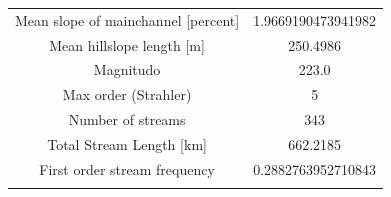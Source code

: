 \documentclass[11pt,]{article}
\begin{document}
\begin{longtable}[]{@{}cc@{}}
\begin{minipage}[t]{0.65\columnwidth}\centering\strut
Mean slope of mainchannel {[}percent{]}\strut
\end{minipage} & \begin{minipage}[t]{0.29\columnwidth}\centering\strut
1.9669190473941982\strut
\end{minipage}\tabularnewline
\begin{minipage}[t]{0.65\columnwidth}\centering\strut
Mean hillslope length {[}m{]}\strut
\end{minipage} & \begin{minipage}[t]{0.29\columnwidth}\centering\strut
250.4986\strut
\end{minipage}\tabularnewline
\begin{minipage}[t]{0.65\columnwidth}\centering\strut
Magnitudo\strut
\end{minipage} & \begin{minipage}[t]{0.29\columnwidth}\centering\strut
223.0\strut
\end{minipage}\tabularnewline
\begin{minipage}[t]{0.65\columnwidth}\centering\strut
Max order (Strahler)\strut
\end{minipage} & \begin{minipage}[t]{0.29\columnwidth}\centering\strut
5\strut
\end{minipage}\tabularnewline
\begin{minipage}[t]{0.65\columnwidth}\centering\strut
Number of streams\strut
\end{minipage} & \begin{minipage}[t]{0.29\columnwidth}\centering\strut
343\strut
\end{minipage}\tabularnewline
\begin{minipage}[t]{0.65\columnwidth}\centering\strut
Total Stream Length {[}km{]}\strut
\end{minipage} & \begin{minipage}[t]{0.29\columnwidth}\centering\strut
662.2185\strut
\end{minipage}\tabularnewline
\begin{minipage}[t]{0.65\columnwidth}\centering\strut
First order stream frequency\strut
\end{minipage} & \begin{minipage}[t]{0.29\columnwidth}\centering\strut
0.2882763952710843\strut
\end{minipage}\tabularnewline
\begin{minipage}[t]{0.65\columnwidth}\centering\strut

\end{minipage}
\end{longtable}
\end{document}

